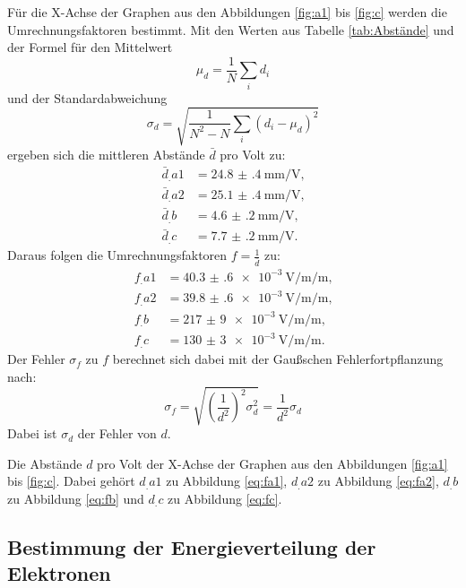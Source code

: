 Für die X-Achse der Graphen aus den Abbildungen \ref{fig:a1} bis \ref{fig:c} werden die Umrechnungsfaktoren bestimmt.
Mit den Werten aus Tabelle \ref{tab:Abstände} und der Formel für den Mittelwert
\[
\mu_d = \frac{1}{N}\sum_i d_i
\]
und der Standardabweichung
\[
\sigma_d = \sqrt{\frac{1}{N^2-N}\sum_i \left(d_i-\mu_d\right)^2}
\]
ergeben sich die mittleren Abstände $\bar{d}$ pro Volt zu:
\begin{align*}
\bar{d}_.{a1} &= \SI{24.8(4)}{\milli\metre\per\volt}\text{,}\\
\bar{d}_.{a2} &= \SI{25.1(4)}{\milli\metre\per\volt}\text{,}\\
\bar{d}_.{b}  &= \SI{4.6(2)}{\milli\metre\per\volt}\text{,}\\
\bar{d}_.{c}  &= \SI{7.7(2)}{\milli\metre\per\volt}\text{.}
\end{align*}
Daraus folgen die Umrechnungsfaktoren $f=\frac{1}{\bar{d}}$ zu:
\begin{align}
f_.{a1} &= \SI{40.3(6)e-3}{\volt\per\milli\per\metre}\text{,}\label{eq:fa1}\\
f_.{a2} &= \SI{39.8(6)e-3}{\volt\per\milli\per\metre}\text{,}\label{eq:fa2}\\
f_.{b}  &= \SI{217(9)e-3}{\volt\per\milli\per\metre}\text{,}\label{eq:fb}\\
f_.{c}  &= \SI{130(3)e-3}{\volt\per\milli\per\metre}\text{.}\label{eq:fc}
\end{align}
Der Fehler $\sigma_{f}$ zu $f$ berechnet sich dabei mit der Gaußschen Fehlerfortpflanzung nach:
\[
\sigma_{f} = \sqrt{\left(\frac{1}{d^2}\right)^2\sigma_d^2} = \frac{1}{d^2}\sigma_d
\]
Dabei ist $\sigma_d$ der Fehler von $d$.

\begin{table}
\centering
\caption{Die Abstände $d$ pro Volt der X-Achse der Graphen aus den Abbildungen \ref{fig:a1} bis \ref{fig:c}. Dabei gehört $d_.{a1}$ zu Abbildung \ref{eq:fa1}, $d_.{a2}$ zu Abbildung \ref{eq:fa2}, $d_.{b}$ zu Abbildung \ref{eq:fb} und $d_.{c}$ zu Abbildung \ref{eq:fc}.}

\label{tab:Abstände}
\end{table}

\subsection{Bestimmung der Energieverteilung der Elektronen}

